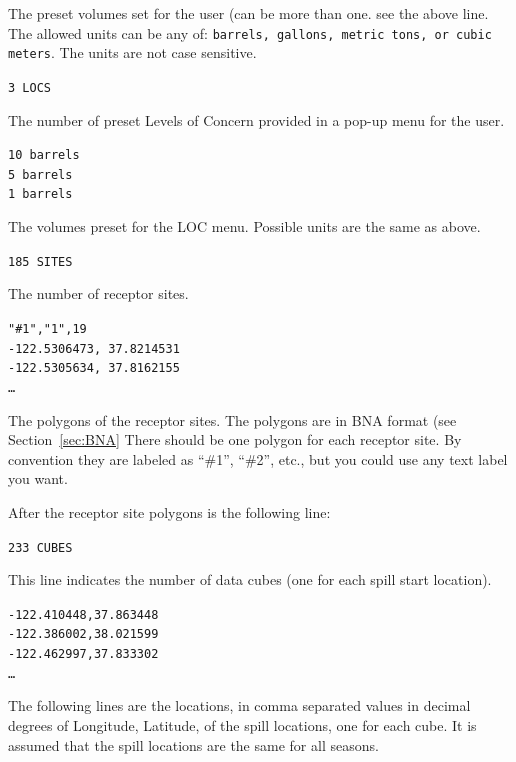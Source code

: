 \documentclass[12pt]{article}      %
\newcommand{\command}[1]{\texttt{#1}}
\newcommand{\fileline}[1]{\begin{flushleft}\texttt{#1}\end{flushleft}}
\begin{document}
The preset volumes set for the user (can be more than one. see the above
line. The allowed units can be any of: \command{barrels, gallons, metric tons, or
cubic meters}. The units are not case sensitive.

\fileline{3 LOCS}
The number of preset Levels of Concern provided in a pop-up menu for the user.
\fileline{10 barrels \\
  5 barrels \\
  1 barrels \\}
The volumes preset for the LOC menu. Possible units are the same as above.
\fileline{185 SITES}
The number of receptor sites.
\fileline{"\#1","1",19 \\
  -122.5306473,    37.8214531 \\
  -122.5305634,    37.8162155  \\
  \ldots }
The polygons of the receptor sites. The polygons are in BNA format 
(see Section~\ref{sec:BNA} There should be one polygon for 
each receptor site. By convention they are labeled as ``\#1'', ``\#2'', 
etc., but you could use any text label you want.

After the receptor site polygons is the following line:
\fileline{233 CUBES}
This line indicates the number of data cubes (one for each spill start 
location).
\fileline{-122.410448,37.863448\\
-122.386002,38.021599 \\
-122.462997,37.833302 \\
\ldots}
The following lines are the locations, in comma separated values in decimal degrees 
of Longitude, Latitude, of the spill locations, one for each cube. It 
is assumed that the spill locations are the same for all seasons.
\end{document}
